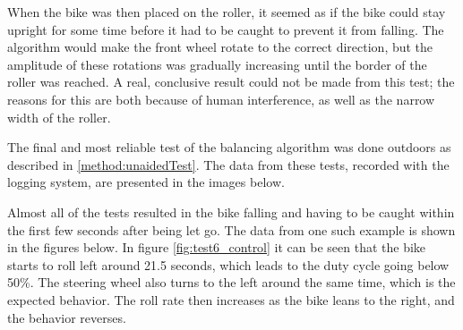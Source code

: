 When the bike was then placed on the roller, it seemed as if the bike could stay upright for some time before it had to be caught to prevent it from falling. The algorithm would make the front wheel rotate to the correct direction, but the amplitude of these rotations was gradually increasing until the border of the roller was reached. A real, conclusive result could not be made from this test; the reasons for this are both because of human interference, as well as the narrow width of the roller.

The final and most reliable test of the balancing algorithm was done outdoors as described in \ref{method:unaidedTest}. The data from these tests, recorded with the logging system, are presented in the images below.

Almost all of the tests resulted in the bike falling and having to be caught within the first few seconds after being let go. The data from one such example is shown in the figures below. In figure \ref{fig:test6_control} it can be seen that the bike starts to roll left around 21.5 seconds, which leads to the duty cycle going below 50\%. The steering wheel also turns to the left around the same time, which is the expected behavior. The roll rate then increases as the bike leans to the right, and the behavior reverses.

